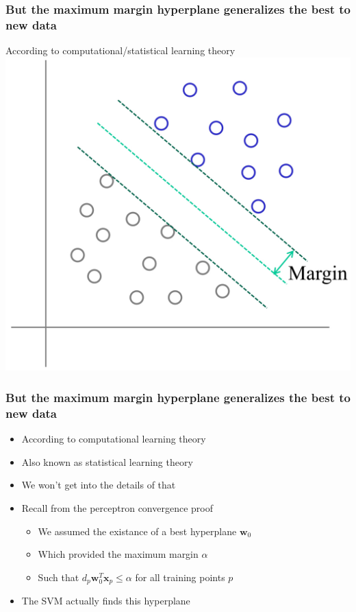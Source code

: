 \documentclass[12pt,notes,mathserif]{beamer}
\begin{document}
\begin{frame}[c]
	\frametitle{But the maximum margin hyperplane generalizes the best to new data}
	\begin{center}
		According to computational/statistical learning theory\\
		\includegraphics[width=0.6\linewidth]{fig8/lec86.jpg}
	\end{center}
\end{frame}


\begin{frame}[c]
	\frametitle{But the maximum margin hyperplane generalizes the best to new data}
	\begin{itemize}
		\item According to computational learning theory
		\item Also known as statistical learning theory
		\item We won't get into the details of that
		\item Recall from the perceptron convergence proof
		      \begin{itemize}
			      \item We assumed the existance of a best hyperplane $\mathbf{w}_0$
			      \item Which provided the maximum margin ${\alpha}$
			      \item Such that $d_p\mathbf{w}_0^T\mathbf{x}_p\leqslant{}\alpha$ for all training points $p$
		      \end{itemize}
		\item The SVM actually finds this hyperplane
	\end{itemize}

\end{frame}
\end{document}
